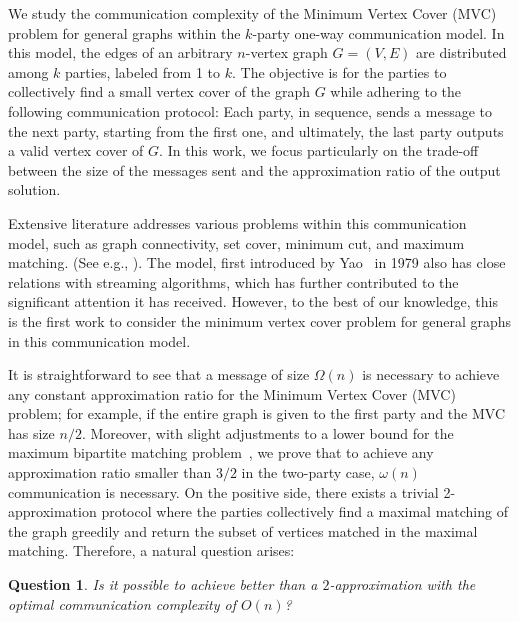 \documentclass[11pt]{article}
\newtheorem{question}{Question}
\begin{document}
We study the communication complexity of the Minimum Vertex Cover (MVC) problem for general graphs within the $k$-party one-way communication model. In this model, the edges of an arbitrary $n$-vertex graph \( G = (V, E) \) are distributed among \( k \) parties, labeled from 1 to \( k \). The objective is for the parties to collectively find a small vertex cover of the graph \( G \) while adhering to the following communication protocol: Each party, in sequence, sends a message to the next party, starting from the first one, and ultimately, the last party outputs a valid vertex cover of \( G \). In this work, we focus particularly on the trade-off between the size of the messages sent and the approximation ratio of the output solution. 


Extensive literature addresses various problems within this communication model, such as graph connectivity, set cover, minimum cut, and maximum matching. (See e.g., \cite{DBLP:conf/soda/GoelKK12, DBLP:conf/soda/Kapralov13, DBLP:conf/approx/SunW15, DBLP:conf/soda/AssadiK18, DBLP:conf/innovations/GhoshS24, DBLP:conf/icalp/AzarmehrB23}). The model, first introduced by Yao~\cite{DBLP:conf/stoc/Yao79} in 1979 also has close relations with streaming algorithms, which has further contributed to the significant attention it has received. However, to the best of our knowledge, this is the first work to consider the minimum vertex cover problem for general graphs in this communication model. 




It is straightforward to see that a message of size \(\Omega(n)\) is necessary to achieve any constant approximation ratio for the Minimum Vertex Cover (MVC) problem; for example, if the entire graph is given to the first party and the MVC has size $n/2$. Moreover, with slight adjustments to a lower bound for the  maximum bipartite matching problem~\cite{DBLP:conf/soda/GoelKK12}, we prove that to achieve any approximation ratio smaller than $3/2$ in the two-party case, \(\omega(n)\) communication is necessary. On the positive side, there exists a trivial 2-approximation protocol where the parties collectively find a maximal matching of the graph greedily and return the subset of vertices matched in the maximal matching. Therefore, a natural question arises:

\begin{question}
    Is it possible to achieve better than a $2$-approximation with the optimal communication complexity of \(O(n)\)? 
\end{question}
\end{document}

